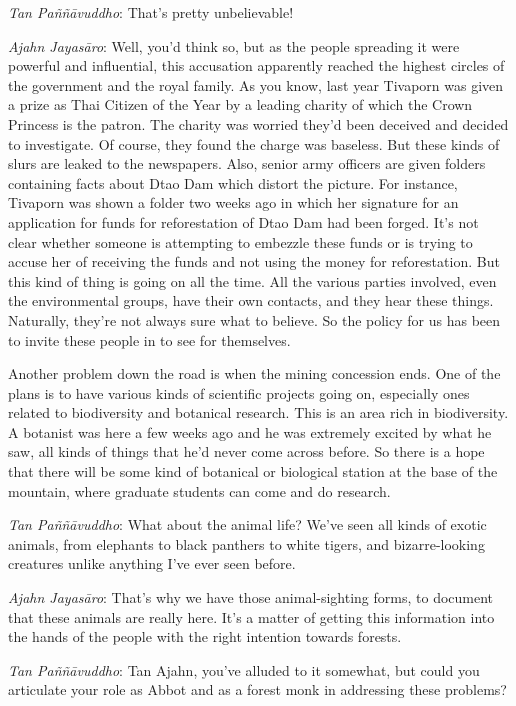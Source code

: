 \emph{Tan Paññāvuddho}: That's pretty unbelievable!

\emph{Ajahn Jayasāro‎}: Well, you'd think so, but as the people
spreading it were powerful and influential, this accusation apparently
reached the highest circles of the government and the royal family. As
you know, last year Tivaporn was given a prize as Thai Citizen of the
Year by a leading charity of which the Crown Princess is the patron. The
charity was worried they'd been deceived and decided to investigate. Of
course, they found the charge was baseless. But these kinds of slurs are
leaked to the newspapers. Also, senior army officers are given folders
containing facts about Dtao Dam which distort the picture. For instance,
Tivaporn was shown a folder two weeks ago in which her signature for an
application for funds for reforestation of Dtao Dam had been forged.
It's not clear whether someone is attempting to embezzle these funds or
is trying to accuse her of receiving the funds and not using the money
for reforestation. But this kind of thing is going on all the time. All
the various parties involved, even the environmental groups, have their
own contacts, and they hear these things. Naturally, they're not always
sure what to believe. So the policy for us has been to invite these
people in to see for themselves.

Another problem down the road is when the mining concession ends. One of
the plans is to have various kinds of scientific projects going on,
especially ones related to biodiversity and botanical research. This is
an area rich in biodiversity. A botanist was here a few weeks ago and he
was extremely excited by what he saw, all kinds of things that he'd
never come across before. So there is a hope that there will be some
kind of botanical or biological station at the base of the mountain,
where graduate students can come and do research.

\emph{Tan Paññāvuddho}‎: What about the animal life? We've seen all
kinds of exotic animals, from elephants to black panthers to white
tigers, and bizarre-looking creatures unlike anything I've ever seen
before.

\emph{Ajahn Jayasāro‎}: That's why we have those animal-sighting forms,
to document that these animals are really here. It's a matter of getting
this information into the hands of the people with the right intention
towards forests.

\emph{Tan Paññāvuddho}‎: Tan Ajahn, you've alluded to it somewhat, but
could you articulate your role as Abbot and as a forest monk in
addressing these problems?


